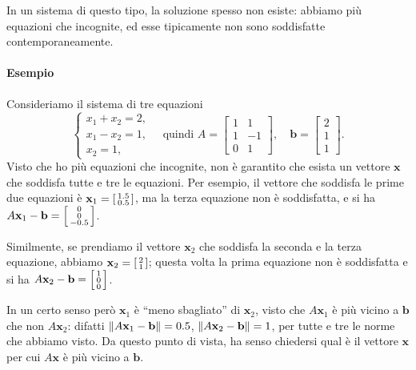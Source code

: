 \documentclass[a4paper]{report}
\DeclarePairedDelimiter{\norm}{\lVert}{\rVert}
\theoremstyle{definition}
\theoremstyle{remark}
\newcommand{\x}{\mathbf{x}}
\renewcommand{\b}{\mathbf{b}}
\begin{document}
In un sistema di questo tipo, la soluzione spesso non esiste: abbiamo più equazioni che incognite, ed esse tipicamente non sono soddisfatte contemporaneamente. 

\paragraph{Esempio} Consideriamo il sistema di tre equazioni
\begin{equation} \label{esminquadrati}
\begin{cases}
    x_1 + x_2 = 2,\\
    x_1 - x_2 = 1,\\
    x_2 = 1,
\end{cases} \quad \text{quindi } A = \begin{bmatrix}
    1 & 1\\
    1 & -1\\
    0 & 1
\end{bmatrix}, \quad \b = \begin{bmatrix}
    2\\1\\1
\end{bmatrix}.
\end{equation}
Visto che ho più equazioni che incognite, non è garantito che esista un vettore $\x$ che soddisfa tutte e tre le equazioni. Per esempio, il vettore che soddisfa le prime due equazioni è $\x_1 = \begin{bsmallmatrix}1.5\\0.5\end{bsmallmatrix}$, ma la terza equazione non è soddisfatta, e si ha $A\x_1 - \b = \begin{bsmallmatrix}0\\0\\-0.5\end{bsmallmatrix}$.

Similmente, se prendiamo il vettore $\x_2$ che soddisfa la seconda e la terza equazione, abbiamo $\x_2 = \begin{bsmallmatrix}2\\1\end{bsmallmatrix}$; questa volta la prima equazione non è soddisfatta e si ha $A\x_2 - \b = \begin{bsmallmatrix}1\\0\\0\end{bsmallmatrix}$.

In un certo senso però $\x_1$ è ``meno sbagliato'' di $\x_2$, visto che $A\x_1$ è più vicino a $\b$ che non $A\x_2$: difatti $\norm{A\x_1-\b} = 0.5$, $\norm{A\x_2 - \b} = 1$, per tutte e tre le norme che abbiamo visto. Da questo punto di vista, ha senso chiedersi qual è il vettore $\x$ per cui $A\x$ è più vicino a $\b$.
\end{document}
